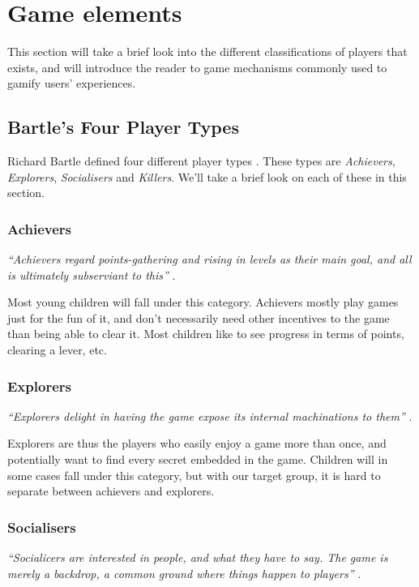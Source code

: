 \section{Game elements}

This section will take a brief look into the different classifications of players that exists, and will introduce the reader to game mechanisms commonly used to gamify users' experiences. 

\subsection{Bartle's Four Player Types}
Richard Bartle defined four different player types \cite{bartle-gamers}. These types are \emph{Achievers},  \emph{Explorers},  \emph{Socialisers} and \emph{Killers}. We'll take a brief look on each of these in this section. 

\subsubsection{Achievers}
\textit{``Achievers regard points-gathering and rising in levels as their main goal, and all is ultimately subserviant to this''} \cite{bartle-gamers}. 

Most young children will fall under this category. Achievers mostly play games just for the fun of it, and don't necessarily need other incentives to the game than being able to clear it. Most children like to see progress in terms of points, clearing a lever, etc. 

\subsubsection{Explorers}
\textit{``Explorers delight in having the game expose its internal machinations to them''} \cite{bartle-gamers}.

Explorers are thus the players who easily enjoy a game more than once, and potentially want to find every secret embedded in the game. Children will in some cases fall under this category, but with our target group, it is hard to separate between achievers and explorers.   

\subsubsection{Socialisers}
\textit{``Socialicers are interested in people, and what they have to say. The game is merely a backdrop, a common ground where things happen to players''} \cite{bartle-gamers}. 

